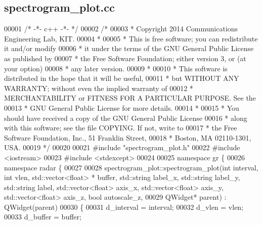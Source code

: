 \subsection{spectrogram\+\_\+plot.\+cc}
\label{spectrogram__plot_8cc_source}

\begin{DoxyCode}
00001 \textcolor{comment}{/* -*- c++ -*- */}
00002 \textcolor{comment}{/* }
00003 \textcolor{comment}{ * Copyright 2014 Communications Engineering Lab, KIT.}
00004 \textcolor{comment}{ * }
00005 \textcolor{comment}{ * This is free software; you can redistribute it and/or modify}
00006 \textcolor{comment}{ * it under the terms of the GNU General Public License as published by}
00007 \textcolor{comment}{ * the Free Software Foundation; either version 3, or (at your option)}
00008 \textcolor{comment}{ * any later version.}
00009 \textcolor{comment}{ * }
00010 \textcolor{comment}{ * This software is distributed in the hope that it will be useful,}
00011 \textcolor{comment}{ * but WITHOUT ANY WARRANTY; without even the implied warranty of}
00012 \textcolor{comment}{ * MERCHANTABILITY or FITNESS FOR A PARTICULAR PURPOSE.  See the}
00013 \textcolor{comment}{ * GNU General Public License for more details.}
00014 \textcolor{comment}{ * }
00015 \textcolor{comment}{ * You should have received a copy of the GNU General Public License}
00016 \textcolor{comment}{ * along with this software; see the file COPYING.  If not, write to}
00017 \textcolor{comment}{ * the Free Software Foundation, Inc., 51 Franklin Street,}
00018 \textcolor{comment}{ * Boston, MA 02110-1301, USA.}
00019 \textcolor{comment}{ */}
00020 
00021 \textcolor{preprocessor}{#include "spectrogram_plot.h"}
00022 \textcolor{preprocessor}{#include <iostream>}
00023 \textcolor{preprocessor}{#include <stdexcept>}
00024 
00025 \textcolor{keyword}{namespace }gr \{
00026     \textcolor{keyword}{namespace }radar \{
00027 
00028         spectrogram_plot::spectrogram_plot(\textcolor{keywordtype}{int} interval, \textcolor{keywordtype}{int} vlen, std::vector<float> *
      buffer, std::string label\_x, std::string label\_y, std::string label, std::vector<float> axis\_x, 
      std::vector<float> axis\_y, std::vector<float> axis\_z, \textcolor{keywordtype}{bool} autoscale\_z,
00029         QWidget* parent) : QWidget(parent)
00030         \{
00031             d_interval = interval;
00032             d_vlen = vlen;
00033             d_buffer = buffer;

\end{DoxyCode}
